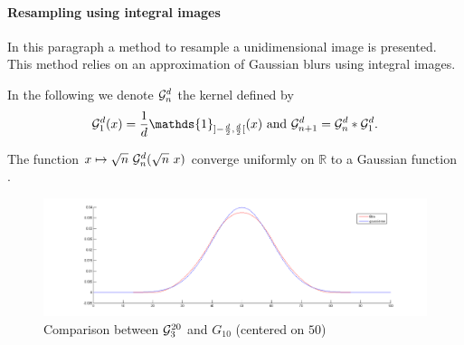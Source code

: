 


\paragraph{Resampling using integral images}
\label{4Integral}

In this paragraph a method to resample a unidimensional image is presented. This method relies on an approximation of Gaussian blurs using integral images.%


In the following we denote $\mathcal{G}_n^d$ the kernel defined by
\begin{equation*}
\Gcal_1^d(x)=\frac{1}{d}\mathds{1}_{]-\frac{d}{2},\frac{d}{2}[}(x) \text{ and } \Gcal_{n+1}^d= \Gcal_n^d * \Gcal_1^d .
\label{formule_convol_n_int}
\end{equation*}

\begin{prop}
The function $x\mapsto \sqrt{n}~\mathcal{G}_n^d(\sqrt{n}~x)$ converge uniformly on $\mathbb{R}$ to a Gaussian function .
\end{prop}


\begin{figure}
\centering
\includegraphics[width=15cm]{filtre_g3.png}
\caption{Comparison between $\mathcal{G}_3^{20}$ and $G_{10}$ (centered on $50$)}
\end{figure}

